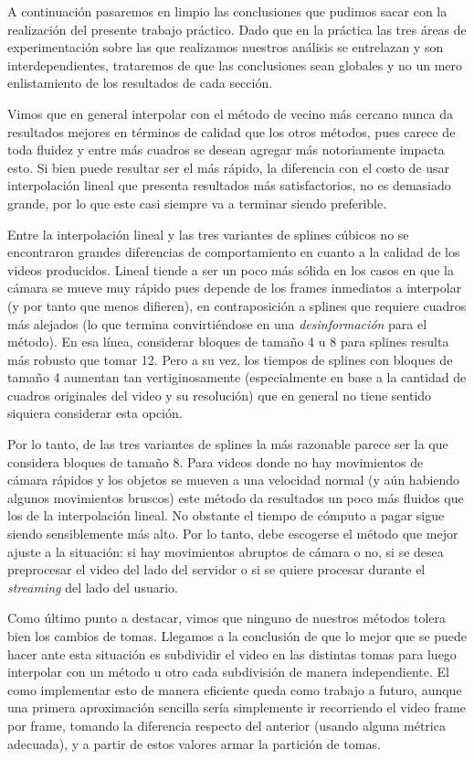 A continuación pasaremos en limpio las conclusiones que pudimos sacar con la realización del presente trabajo práctico. Dado que en la práctica las tres áreas de experimentación sobre las que realizamos nuestros análisis se entrelazan y son interdependientes, trataremos de que las conclusiones sean globales y no un mero enlistamiento de los resultados de cada sección. 

Vimos que en general interpolar con el método de vecino más cercano nunca da resultados mejores en términos de calidad que los otros métodos, pues carece de toda fluidez y entre más cuadros se desean agregar más notoriamente impacta esto. Si bien puede resultar ser el más rápido, la diferencia con el costo de usar interpolación lineal que presenta resultados más satisfactorios, no es demasiado grande, por lo que este casi siempre va a terminar siendo preferible. 

Entre la interpolación lineal y las tres variantes de splines cúbicos no se encontraron grandes diferencias de comportamiento en cuanto a la calidad de los videos producidos. Lineal tiende a ser un poco más sólida en los casos en que la cámara se mueve muy rápido pues depende de los frames inmediatos a interpolar (y por tanto que menos difieren), en contraposición a splines que requiere cuadros más alejados (lo que termina convirtiéndose en una \emph{desinformación} para el método). En esa línea, considerar bloques de tamaño 4 u 8 para splines resulta más robusto que tomar 12. Pero a su vez, los tiempos de splines con bloques de tamaño 4 aumentan tan vertiginosamente (especialmente en base a la cantidad de cuadros originales del video y su resolución) que en general no tiene sentido siquiera considerar esta opción.

Por lo tanto, de las tres variantes de splines la más razonable parece ser la que considera bloques de tamaño 8. Para videos donde no hay movimientos de cámara rápidos y los objetos se mueven a una velocidad normal (y aún habiendo algunos movimientos bruscos) este método da resultados un poco más fluidos que los de la interpolación lineal. No obstante el tiempo de cómputo a pagar sigue siendo sensiblemente más alto. Por lo tanto, debe escogerse el método que mejor ajuste a la situación: si hay movimientos abruptos de cámara o no, si se desea preprocesar el video del lado del servidor o si se quiere procesar durante el \textit{streaming} del lado del usuario.

Como último punto a destacar, vimos que ninguno de nuestros métodos tolera bien los cambios de tomas. Llegamos a la conclusión de que lo mejor que se puede hacer ante esta situación es subdividir el video en las distintas tomas para luego interpolar con un método u otro cada subdivisión de manera independiente. El como implementar esto de manera eficiente queda como trabajo a futuro, aunque una primera aproximación sencilla sería simplemente ir recorriendo el video frame por frame, tomando la diferencia respecto del anterior (usando alguna métrica adecuada), y a partir de estos valores armar la partición de tomas.